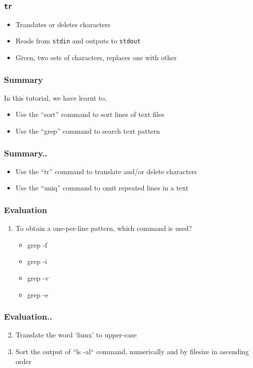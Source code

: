 \documentclass[17pt,compress]{beamer}
\begin{document}
\begin{frame}[fragile]
  \frametitle{\texttt{tr}}
  \begin{itemize}
  \item Translates or deletes characters
  \item Reads from \texttt{stdin} and outputs to \texttt{stdout}
  \item Given, two sets of characters, replaces one with other
  \end{itemize}
\end{frame}

\begin{frame}
\frametitle{Summary}
\label{sec-8}

  In this tutorial, we have learnt to,


\begin{itemize}
\item Use the ``sort'' command to sort lines of text files
\item Use the ``grep'' command to search text pattern
\end{itemize}
\end{frame}

\begin{frame}
\frametitle{Summary..}
\begin{itemize}
\item Use the ``tr'' command to translate and/or delete characters
\item Use the ``uniq'' command to omit repeated lines in a text
\end{itemize}
\end{frame}

\begin{frame}[fragile]
\frametitle{Evaluation}
\label{sec-9}


\begin{enumerate}
\item To obtain a one-per-line pattern, which command is used? 
\vspace{3pt}
\begin{itemize}
\item grep -f
\item grep -i
\item grep -v
\item grep -e
\end{itemize}
\end{enumerate}
\end{frame}

\begin{frame}[fragile]
\frametitle{Evaluation..}
\begin{enumerate}
\setcounter{enumi}{1}
\item Translate the word `linux' to upper-case
\vspace{8pt}
\item Sort the output of ``ls -al`` command, numerically and by filesize in ascending order
\end{enumerate}
\end{frame}
\end{document}
